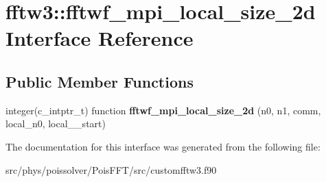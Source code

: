 \hypertarget{interfacefftw3_1_1fftwf__mpi__local__size__2d}{}\section{fftw3\+:\+:fftwf\+\_\+mpi\+\_\+local\+\_\+size\+\_\+2d Interface Reference}
\label{interfacefftw3_1_1fftwf__mpi__local__size__2d}
\subsection*{Public Member Functions}
\begin{DoxyCompactItemize}
\item 
integer(c\+\_\+intptr\+\_\+t) function {\bfseries fftwf\+\_\+mpi\+\_\+local\+\_\+size\+\_\+2d} (n0, n1, comm, local\+\_\+n0, local\+\_\+\_\+start)\hypertarget{interfacefftw3_1_1fftwf__mpi__local__size__2d_a9f6093e4a3af20e4d5868e3305387b2e}{}\label{interfacefftw3_1_1fftwf__mpi__local__size__2d_a9f6093e4a3af20e4d5868e3305387b2e}

\end{DoxyCompactItemize}


The documentation for this interface was generated from the following file\+:\begin{DoxyCompactItemize}
\item 
src/phys/poissolver/\+Pois\+F\+F\+T/src/customfftw3.\+f90\end{DoxyCompactItemize}
